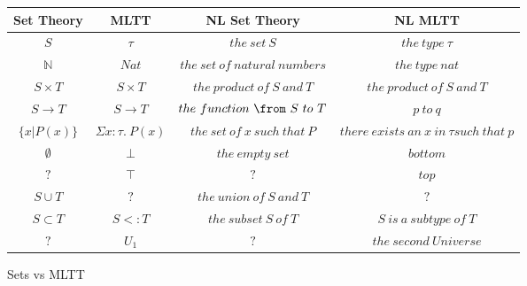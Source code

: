 \begin{figure}[H]
\centering
\begin{tabular}{|c|c|c|c|} \hline
  Set Theory & MLTT & NL Set Theory & NL MLTT \\ \hline
 $S$          & $\tau$                 & $the\ set\ S$                     & $the\ type\ \tau$ \\ 
 $\mathbb{N}$ & $Nat$                  & $the\ set\ of\ natural\ numbers$  & $the\ type\ nat$ \\
 $S \times T$ & $S \times T$           & $the\ product\ of\ S\ and\ T$     & $the\  product\  of\  S\  and\  T$ \\
 $S \to T$    & $S \to T$              & $the\ function\ \from\ S\ to\ T$  & $p\  to\  q$ \\
 $\{x|P(x)\}$ & $\Sigma x : \tau.\ P(x)$ & $the\ set\ of\ x\ such\ that\ P$  & $there\ exists\ an\ x\ in\ \tau such\ that\ p$ \\
 $\emptyset$  & $\bot$                 & $the\ empty\ set$                 & $bottom$ \\
 $?$          & $\top$                 & $?$                             & $top$ \\
 $S \cup T$   & $?$                    & $the\ union\ of\ S\ and\ T$       & $?$ \\
 $S \subset T$ & $S <: T$              & $the\ subset\ S\ of\ T$          & $S\ is\ a\ subtype\ of\ T$ \\
 $?$          & $U_1$                  & $?$ & $the\ second\ Universe$        \\ \hline 
\end{tabular}
\caption{Sets vs MLTT} \label{fig:M6}
\end{figure}




